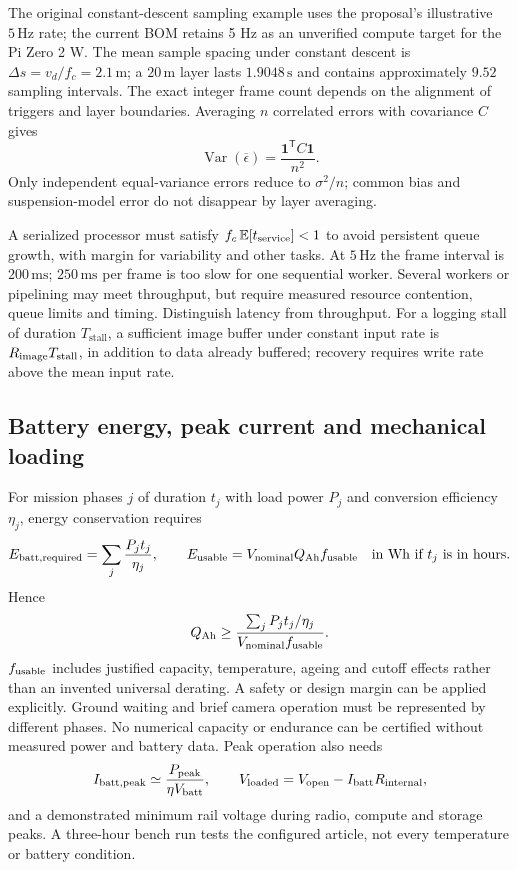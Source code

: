 \documentclass[11pt,a4paper]{article}
\numberwithin{equation}{section}
\begin{document}
The original constant-descent sampling example uses the proposal's illustrative
$5\,\mathrm{Hz}$ rate; the current BOM retains 5 Hz as an unverified compute
target for the Pi Zero 2 W. The mean sample spacing under constant descent is
$\Delta s=v_d/f_c=2.1\,\mathrm m$; a $20\,\mathrm m$ layer lasts
$1.9048\,\mathrm s$ and contains approximately $9.52$ sampling intervals.
The exact integer frame count depends on the alignment of triggers and
layer boundaries. Averaging $n$ correlated errors with covariance $C$
gives
\begin{equation}
 \operatorname{Var}(\overline\epsilon)=\frac{\boldsymbol1^{\mathsf T}C\boldsymbol1}{n^2}.
\end{equation}
Only independent equal-variance errors reduce to $\sigma^2/n$; common
bias and suspension-model error do not disappear by layer averaging.

A serialized processor must satisfy $f_c\,\mathbb E[t_{\rm service}]<1$
to avoid persistent queue growth, with margin for variability and other
tasks. At $5\,\mathrm{Hz}$ the frame interval is $200\,\mathrm{ms}$;
$250\,\mathrm{ms}$ per frame is too slow for one sequential worker.
Several workers or pipelining may meet throughput, but require measured
resource contention, queue limits and timing. Distinguish latency from
throughput. For a logging stall of duration $T_{\mathrm{stall}}$, a sufficient
image buffer under constant input rate is $R_{\rm image}T_{\mathrm{stall}}$,
in addition to data already buffered; recovery requires write rate above
the mean input rate.

\subsection{Battery energy, peak current and mechanical loading}

For mission phases $j$ of duration $t_j$ with load power $P_j$ and
conversion efficiency $\eta_j$, energy conservation requires
\begin{equation}
 E_{\rm batt,required}=\sum_j\frac{P_jt_j}{\eta_j},\qquad
 E_{\rm usable}=V_{\rm nominal}Q_{\rm Ah}f_{\rm usable}
 \quad\text{in Wh if $t_j$ is in hours}.
\end{equation}
Hence
\begin{equation}
 Q_{\rm Ah}\geq\frac{\sum_j P_jt_j/\eta_j}
                    {V_{\rm nominal}f_{\rm usable}}.
\end{equation}
$f_{\rm usable}$ includes justified capacity, temperature, ageing and
cutoff effects rather than an invented universal derating. A safety or
design margin can be applied explicitly. Ground waiting and brief camera
operation must be represented by different phases. No numerical capacity
or endurance can be certified without measured power and battery data.
Peak operation also needs
\begin{equation}
 I_{\rm batt,peak}\simeq\frac{P_{\rm peak}}{\eta V_{\rm batt}},\qquad
 V_{\rm loaded}=V_{\rm open}-I_{\rm batt}R_{\rm internal},
\end{equation}
and a demonstrated minimum rail voltage during radio, compute and storage
peaks. A three-hour bench run tests the configured article, not every
temperature or battery condition.
\end{document}
